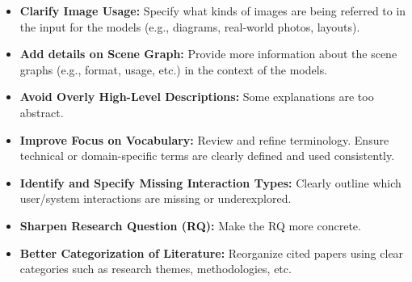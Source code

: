 \documentclass{article}
\begin{document}
\begin{itemize}
    \item \textbf{Clarify Image Usage:} Specify what kinds of images are being referred to in the input for the models (e.g., diagrams, real-world photos, layouts).
    
    \item \textbf{Add details on Scene Graph:} Provide more information about the scene graphs (e.g., format, usage, etc.) in the context of the models.
    
    \item \textbf{Avoid Overly High-Level Descriptions:} Some explanations are too abstract.
    
    \item \textbf{Improve Focus on Vocabulary:} Review and refine terminology. Ensure technical or domain-specific terms are clearly defined and used consistently.
    
    \item \textbf{Identify and Specify Missing Interaction Types:} Clearly outline which user/system interactions are missing or underexplored.
    
    \item \textbf{Sharpen Research Question (RQ):} Make the RQ more concrete.
    
    \item \textbf{Better Categorization of Literature:} Reorganize cited papers using clear categories such as research themes, methodologies, etc.
\end{itemize}



\end{document}
